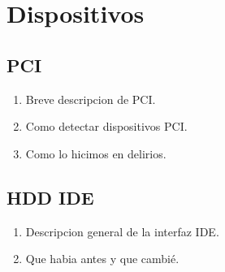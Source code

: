 \section{Dispositivos}

\subsection{PCI}
\begin{enumerate}
  \item Breve descripcion de PCI.
  \item Como detectar dispositivos PCI.
  \item Como lo hicimos en delirios.
\end{enumerate}

\subsection{HDD IDE}
\begin{enumerate}
  \item Descripcion general de la interfaz IDE.
  \item Que habia antes y que cambié.
\end{enumerate}

